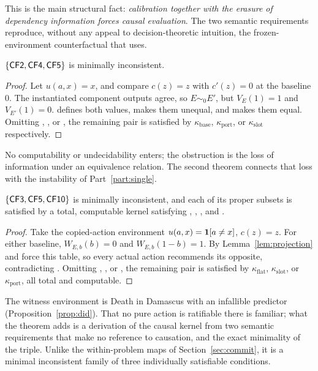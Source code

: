This is the main structural fact: \emph{calibration together with the erasure of dependency
information forces causal evaluation}. The two semantic requirements reproduce, without any
appeal to decision-theoretic intuition, the frozen-environment counterfactual that  uses.

\begin{theorem}\label{thm:transport}
$\{\textup{\textsf{CF2}},\textup{\textsf{CF4}},\textup{\textsf{CF5}}\}$ is minimally inconsistent.
\end{theorem}

\begin{proof}
Let $u(a,x)=x$, and compare $c(z)=z$ with $c'(z)=0$ at the baseline $0$. The instantiated component
outputs agree, so $E\sim_0E'$, but $V_E(1)=1$ and $V_{E'}(1)=0$.  defines both values,
 makes them unequal, and  makes them equal. Omitting , , or
, the remaining pair is satisfied by $\kappa_{\mathrm{base}}$, $\kappa_{\mathrm{port}}$, or
$\kappa_{\mathrm{slot}}$ respectively.
\end{proof}

No computability or undecidability enters; the obstruction is the loss of information under an
equivalence relation. The second theorem connects that loss with the instability of
Part~\ref{part:single}.

\begin{theorem}\label{thm:calibration}
$\{\textup{\textsf{CF3}},\textup{\textsf{CF5}},\textup{\textsf{CF10}}\}$ is minimally inconsistent, and each of its proper subsets is satisfied
by a total, computable kernel satisfying , , , and .
\end{theorem}

\begin{proof}
Take the copied-action environment $u(a,x)=\mathbf{1}[a\neq x]$, $c(z)=z$. For either baseline,
$W_{E,b}(b)=0$ and $W_{E,b}(1-b)=1$. By Lemma~\ref{lem:projection}  and  force this table,
so every actual action recommends its opposite, contradicting . Omitting , ,
or , the remaining pair is satisfied by $\kappa_{\mathrm{flat}}$, $\kappa_{\mathrm{slot}}$, or
$\kappa_{\mathrm{port}}$, all total and computable.
\end{proof}

The witness environment is Death in Damascus with an infallible predictor
(Proposition~\ref{prop:did}). That no pure action is ratifiable there is familiar; what the theorem
adds is a derivation of the causal kernel from two semantic requirements that make no reference to
causation, and the exact minimality of the triple. Unlike the within-problem maps of
Section~\ref{sec:commit}, it is a minimal inconsistent family of three individually satisfiable
conditions.

